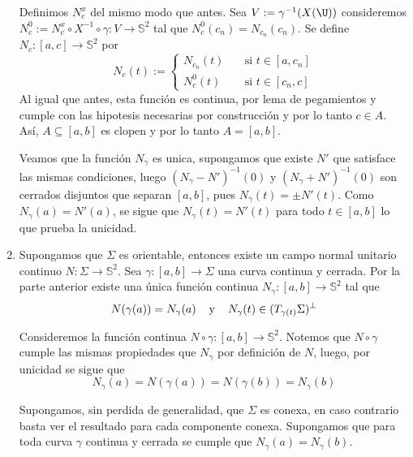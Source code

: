 \documentclass{article}
\begin{document}
\begin{enumerate}
    Definimos $N_{c}^{x}$ del mismo modo que antes. Sea $V:=\gamma^{-1}(X(\U))$ consideremos 
    $N_{c}^{0}:=N_{c}^{x}\circ X^{-1}\circ\gamma:V\to\mathbb{S}^{2}$ tal que $N_{c}^{0}(c_{n})
    =N_{c_{n}}(c_{n})$. Se define $N_{c}:[a,c]\to\mathbb{S}^{2}$ por
    \begin{equation*}
        N_{c}(t):=\begin{cases}
            N_{c_{n}}(t) &\quad\text{si }t\in[a,c_{n}] \\
            N_{c}^{0}(t) &\quad\text{si }t\in[c_{n},c]
        \end{cases}
    \end{equation*}
    Al igual que antes, esta función es continua, por lema de pegamientos y cumple con las 
    hipotesis necesarias por construcción y por lo tanto $c\in A$. Así, $A\subseteq[a,b]$ es clopen
    y por lo tanto $A=[a,b]$.

    \noindent Veamos que la función $N_{\gamma}$ es unica, supongamos que existe $N'$ que 
    satisface las mismas condiciones, luego $(N_{\gamma}-N')^{-1}(0)$ y $(N_{\gamma}+N')^{-1}(0)$
    son cerrados disjuntos que separan $[a,b]$, pues $N_{\gamma}(t)=\pm N'(t)$. Como 
    $N_{\gamma}(a)=N'(a)$, se sigue que $N_{\gamma}(t)=N'(t)$ para todo $t\in[a,b]$ lo que prueba 
    la unicidad.

    \item Supongamos que $\Sigma$ es orientable, entonces existe un campo normal unitario continuo
    $N:\Sigma\to\mathbb{S}^{2}$. Sea $\gamma:[a,b]\to\Sigma$ una curva continua y cerrada. Por la
    parte anterior existe una única función continua $N_{\gamma}:[a,b]\to\mathbb{S}^{2}$ tal que 
    \begin{equation*}
        N(\gamma(a))=N_{\gamma}(a)\hspace{4mm}\text{y}\hspace{4mm}
        N_{\gamma}(t)\in(T_{\gamma(t)}\Sigma)^{\perp}
    \end{equation*}
    
    \vspace{2mm}
    Consideremos la función continua $N\circ\gamma:[a,b]\to\mathbb{S}^{2}$. Notemos que 
    $N\circ\gamma$ cumple las mismas propiedades que $N_{\gamma}$ por definición de $N$, luego,
    por unicidad se sigue que
    \begin{equation*}
        N_{\gamma}(a)=N(\gamma(a))=N(\gamma(b))=N_{\gamma}(b)
    \end{equation*}

    
    \noindent Supongamos, sin perdida de generalidad, que $\Sigma$ es conexa, en caso contrario 
    basta ver el resultado para cada componente conexa. Supongamos que para toda curva $\gamma$ 
    continua y cerrada se cumple que $N_{\gamma}(a)=N_{\gamma}(b)$. 
    

\end{enumerate}
\end{document}
